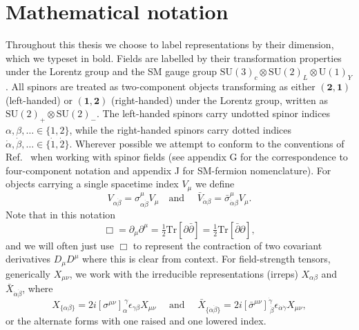 
\chapter{Mathematical notation}
\label{chapter:notation}

Throughout this thesis we choose to label representations by their dimension,
which we typeset in bold. Fields are labelled by their transformation properties
under the Lorentz group and the SM gauge group
$\mathrm{SU}(3)_{c} \otimes \mathrm{SU}(2)_{L} \otimes \mathrm{U}(1)_{Y}$. All
spinors are treated as two-component objects transforming as either
$(\mathbf{2}, \mathbf{1})$ (left-handed) or $(\mathbf{1}, \mathbf{2})$
(right-handed) under the Lorentz group, written as
$\mathrm{SU}(2)_{+} \otimes \mathrm{SU}(2)_{-}$. The left-handed spinors carry
undotted spinor indices $\alpha, \beta, \ldots \in \{1, 2\}$, while the
right-handed spinors carry dotted indices
$\dot{\alpha}, \dot{\beta}, \ldots \in \{\dot{1}, \dot{2}\}$. Wherever possible
we attempt to conform to the conventions of Ref.~\cite{Dreiner:2008tw} when
working with spinor fields (see appendix G for the correspondence to
four-component notation and appendix J for SM-fermion nomenclature). For objects
carrying a single spacetime index $V_\mu$ we define
\begin{equation}
  V_{\alpha \dot{\beta}} = \sigma^\mu_{\alpha \dot{\beta}} V_\mu \quad \text{
    and
  } \quad \bar{V}_{\dot{\alpha}\beta } = \bar{\sigma}^\mu_{\dot{\alpha}\beta} V_{\mu}.
\end{equation}
Note that in this notation
\begin{equation}
  \Box = \partial_{\mu} \partial^{\mu} = \tfrac{1}{2}\text{Tr}[\partial \bar{\partial}] = \tfrac{1}{2}\text{Tr}[\bar{\partial} \partial],
\end{equation}
and we will often just use $\Box$ to represent the contraction of two covariant
derivatives $D_{\mu}D^{\mu}$ where this is clear from context. For
field-strength tensors, generically $X_{\mu\nu}$, we work with the irreducible
representations (irreps) $X_{\alpha \beta}$ and
$\bar{X}_{\dot{\alpha} \dot{\beta}}$, where
\begin{equation}
  X_{\{\alpha \beta\}} = 2i [\sigma^{\mu \nu}]^{~\gamma}_\alpha \epsilon_{\gamma \beta} X_{\mu \nu} \quad \text{ and } \quad
  \bar{X}_{\{\dot{\alpha} \dot{\beta}\}} = 2i [\bar{\sigma}^{\mu \nu}]^{\dot{\gamma}}_{~\dot{\beta}} \epsilon_{\dot{\alpha} \dot{\gamma}} X_{\mu \nu},
\end{equation}
or the alternate forms with one raised and one lowered index.

